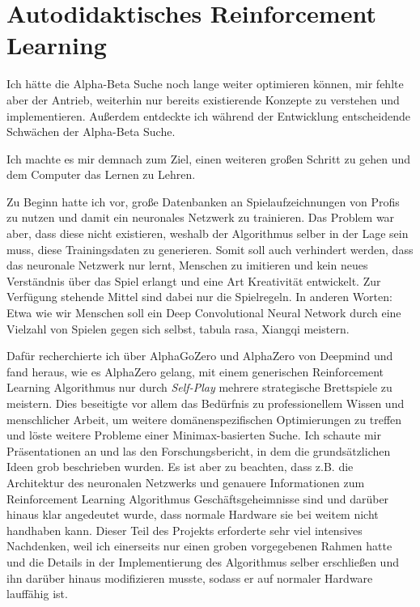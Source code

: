 \documentclass{jpp}
\begin{document}
\section{Autodidaktisches Reinforcement Learning}
Ich hätte die Alpha-Beta Suche noch lange weiter optimieren können, mir fehlte aber der Antrieb, weiterhin nur bereits existierende Konzepte zu verstehen und implementieren. Außerdem entdeckte ich während der Entwicklung entscheidende Schwächen der Alpha-Beta Suche.

Ich machte es mir demnach zum Ziel, einen weiteren großen Schritt zu gehen und dem Computer das Lernen zu Lehren. 

Zu Beginn hatte ich vor, große Datenbanken an Spielaufzeichnungen von Profis zu nutzen und damit ein neuronales Netzwerk zu trainieren. Das Problem war aber, dass diese nicht existieren, weshalb der Algorithmus selber in der Lage sein muss, diese Trainingsdaten zu generieren. Somit soll auch verhindert werden, dass das neuronale Netzwerk nur lernt, Menschen zu imitieren und kein neues Verständnis über das Spiel erlangt und eine Art Kreativität entwickelt. Zur Verfügung stehende Mittel sind dabei nur die Spielregeln. In anderen Worten: Etwa wie wir Menschen soll ein Deep Convolutional Neural Network durch eine Vielzahl von Spielen gegen sich selbst, tabula rasa, Xiangqi meistern. 

Dafür recherchierte ich über AlphaGoZero \cite{ag0} und AlphaZero \cite{a0} von Deepmind und fand heraus, wie es AlphaZero gelang, mit einem generischen Reinforcement Learning Algorithmus nur durch \textit{Self-Play} mehrere strategische Brettspiele zu meistern. Dies beseitigte vor allem das Bedürfnis zu professionellem Wissen und menschlicher Arbeit, um weitere domänenspezifischen Optimierungen zu treffen und löste weitere Probleme einer Minimax-basierten Suche.
Ich schaute mir Präsentationen an und  las den Forschungsbericht, in dem die grundsätzlichen Ideen grob beschrieben wurden. Es ist aber zu beachten, dass z.B. die Architektur des neuronalen Netzwerks und genauere Informationen zum Reinforcement Learning Algorithmus Geschäftsgeheimnisse sind und darüber hinaus klar angedeutet wurde, dass normale Hardware sie bei weitem nicht handhaben kann. Dieser Teil des Projekts erforderte sehr viel intensives Nachdenken, weil ich einerseits nur einen groben vorgegebenen Rahmen hatte und die Details in der Implementierung des Algorithmus selber erschließen und ihn darüber hinaus modifizieren musste, sodass er auf normaler Hardware lauffähig ist.
\end{document}
